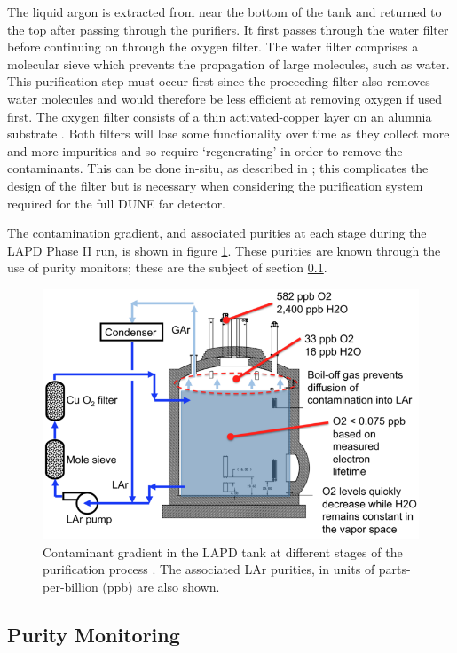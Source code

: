 The liquid argon is extracted from near the bottom of the tank and returned to the top after passing through the purifiers.  It first passes through the water filter before continuing on through the oxygen filter.  The water filter comprises a molecular sieve which prevents the propagation of large molecules, such as water.  This purification step must occur first since the proceeding filter also removes water molecules and would therefore be less efficient at removing oxygen if used first.  The oxygen filter consists of a thin activated-copper layer on an alumnia substrate \cite{LArFilter}.  Both filters will lose some functionality over time as they collect more and more impurities and so require `regenerating' in order to remove the contaminants.  This can be done in-situ, as described in \cite{LArFilter}; this complicates the design of the filter but is necessary when considering the purification system required for the full DUNE far detector.

The contamination gradient, and associated purities at each stage during the LAPD Phase II run, is shown in figure \ref{fig:LAPDPurity}.  These purities are known through the use of purity monitors; these are the subject of section \ref{sec:PurityMonitoring}.

\begin{figure}[ht]
  \centering
  \includegraphics[width=12cm]{LAPDPurity.png}
  \caption[Contaminant gradient in the LAPD tank]{Contaminant gradient in the LAPD tank at different stages of the purification process \cite{LAPD}.  The associated LAr purities, in units of parts-per-billion (ppb) are also shown.}
  \label{fig:LAPDPurity}
\end{figure}

\subsection{Purity Monitoring}\label{sec:PurityMonitoring}

